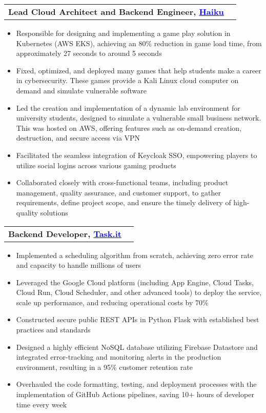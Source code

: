 \documentclass[letterpaper,11pt]{article}
\makeatletter
\newcommand{\resumeItem}[1]{
  \item\small{
    {#1 \vspace{-2pt}}
  }
}
\newcommand{\resumeProjectHeading}[2]{
    \vspace{-2pt}\item
    \begin{tabular*}{0.97\textwidth}{l@{\extracolsep{\fill}}r}
      \small#1 & #2 \\
    \end{tabular*}\vspace{-7pt}
}
\newcommand{\resumeItemListStart}{\begin{itemize}}
\newcommand{\resumeItemListEnd}{\end{itemize}\vspace{-5pt}}
\makeatother
\begin{document}
\resumeProjectHeading
{\textbf{Lead Cloud Architect and Backend Engineer, {\href{https://haikuinc.io/}{\textcolor{blue}{Haiku}}}} \emph}{}
\resumeItemListStart
\resumeItem{Responsible for designing and implementing a game play solution in Kubernetes (AWS EKS), achieving an 80\% reduction in game load time, from approximately 27 seconds to around 5 seconds}
\resumeItem{Fixed, optimized, and deployed many games that help students make a career in cybersecurity. These games provide a Kali Linux cloud computer on demand and simulate vulnerable software}
\resumeItem{Led the creation and implementation of a dynamic lab environment for university students, designed to simulate a vulnerable small business network. This was hosted on AWS, offering features such as on-demand creation, destruction, and secure access via VPN}
\resumeItem{Facilitated the seamless integration of Keycloak SSO, empowering players to utilize social logins across various gaming products}
\resumeItem{Collaborated closely with cross-functional teams, including product management, quality assurance, and customer support, to gather requirements, define project scope, and ensure the timely delivery of high-quality solutions}
\resumeItemListEnd

\resumeProjectHeading
{\textbf{Backend Developer, {\href{https://www.task.it/}{\textcolor{blue}{Task.it}}}} \emph}{}
\resumeItemListStart
\resumeItem{Implemented a scheduling algorithm from scratch, achieving zero error rate and capacity to handle millions of users} %
\resumeItem{Leveraged the Google Cloud platform (including App Engine, Cloud Tasks, Cloud Run, Cloud Scheduler, and other advanced tools) to deploy the service, scale up performance, and reducing operational costs by 70\%} %
\resumeItem {Constructed secure public REST APIs in Python Flask with established best practices and standards} %
\resumeItem{Designed a highly efficient NoSQL database utilizing Firebase Datastore and integrated error-tracking and monitoring alerts in the production environment, resulting in a 95\% customer retention rate} %
\resumeItem{Overhauled the code formatting, testing, and deployment processes with the implementation of GitHub Actions pipelines, saving 10+ hours of developer time every week} %
\resumeItemListEnd
\end{document}
